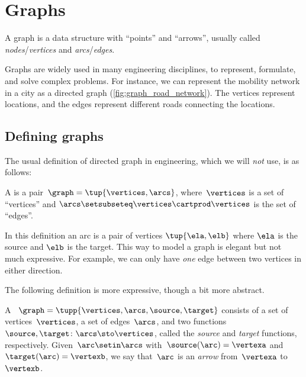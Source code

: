 
\section{Graphs}

A graph is a data structure with ``points'' and ``arrows'', usually called \emph{no\-des}/\emph{ver\-tices} and \emph{arcs}/\emph{edges}.

\begin{marginfigure}
    \caption{}
    \label{fig:graph_road_network}
\end{marginfigure}


Graphs are widely used in many engineering disciplines, to represent, formulate, and solve complex problems.
For instance, we can represent the mobility network in a city as a directed graph (\cref{fig:graph_road_network}).
The vertices represent locations, and the edges represent different roads connecting the locations.

\subsection{Defining graphs}

The usual definition of directed graph in engineering, which we will \emph{not} use, is as follows:

\begin{definition}
    \label{def:directed-graph}
    A \emph{} is a pair~$\graph=\tup{\vertices, \arcs}$, where~$\vertices$ is
    a set of ``vertices'' and $\arcs \setsubseteq \vertices \cartprod \vertices$ is the set of ``edges''.
\end{definition}
In this definition an arc is a pair of vertices $\tup{\ela,\elb}$ where $\ela$ is the source and $\elb$ is the target.
This way to model a graph is elegant but not much expressive.
For example, we can only have \emph{one} edge between two vertices in either direction.

The following definition is more expressive, though a bit more abstract.

\begin{definition}
    \label{def:Graph}
    A \emph{}~$\graph=\tupp{\vertices,\arcs, \source,\target}$ consists of a set of vertices~$\vertices$, a set of edges~$\arcs$, and two functions~$\source,\target \colon \arcs \sto \vertices$, called the \emph{source} and \emph{target} functions, respectively.
    Given~$\arc\setin \arcs$ with~$\source(\arc)=\vertexa$ and~$\target(\arc)=\vertexb$, we say that~$\arc$ is an \emph{arrow} from~$\vertexa$ to~$\vertexb$.
\end{definition}

